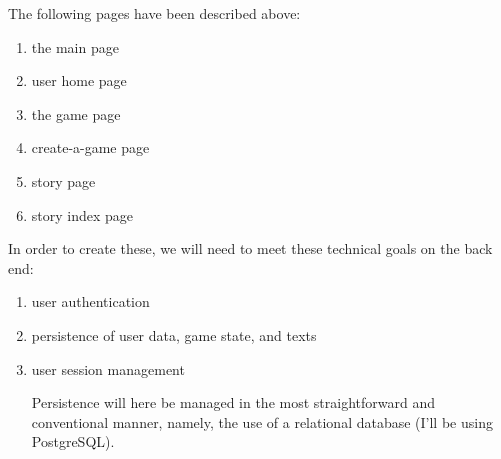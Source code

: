 \documentclass{manual}
\begin{document}
The following pages have been described above:

\begin{enumerate}

\item{the main page}
\item{user home page}
\item{the game page}
\item{create-a-game page}
\item{story page}
\item{story index page}

\end{enumerate}

In order to create these, we will need to meet these technical goals 
on the back end:

\begin{enumerate}

\item{user authentication}
\item{persistence of user data, game state, and texts}
\item{user session management}

Persistence will here be managed in the most straightforward and
conventional manner, namely, the use of a relational database (I'll be
using PostgreSQL).  
\end{enumerate}
\end{document}

